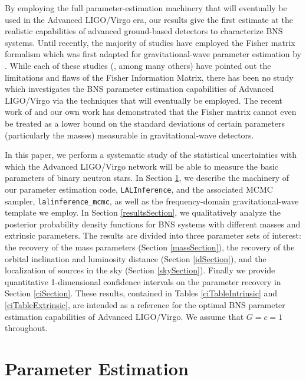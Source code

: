 \documentclass[11pt,a4paper]{emulateapj}
\begin{document}
By employing the full parameter-estimation machinery that will eventually be
used in the Advanced LIGO/Virgo era, our results give the first estimate at the 
realistic capabilities of advanced ground-based detectors to characterize BNS systems.
  Until recently, the majority of studies have employed the Fisher matrix formalism which was 
first adapted for gravitational-wave parameter estimation by \citep{FinnDetection}.
While each of these studies (\cite{PoissonWill,CutlerFlanagan,ArunPE}, among 
many others) have pointed out the limitations 
and flaws of the Fisher Information Matrix, there has been no study which investigates
the BNS parameter estimation capabilities of Advanced LIGO/Virgo via the techniques
that will eventually be employed.  The recent work of \cite{Vallisneri} and our 
own work \citep{Inadequacies} has demonstrated that the Fisher matrix cannot even
be treated as a lower bound on the standard deviations of certain parameters
(particularly the masses) measurable in gravitational-wave detectors.

In this paper, we perform a systematic study of the statistical uncertainties with
which the Advanced LIGO/Virgo network will be able to measure the basic parameters of 
binary neutron stars.  In Section \ref{PEsection}, we describe
the machinery of our parameter estimation code, \texttt{LALInference}, and the associated
MCMC sampler, \texttt{lalinference\_mcmc}, as well as the frequency-domain 
gravitational-wave template we employ.   In Section \ref{resultsSection}, we qualitatively 
analyze the posterior probability density functions for BNS systems with different masses 
and extrinsic parameters.  The results are divided into three parameter sets of interest: the
recovery of the mass parameters (Section \ref{massSection}), the recovery of the orbital
inclination and luminosity distance (Section \ref{idSection}), and the localization of sources 
in the sky (Section \ref{skySection}).   Finally we provide quantitative 1-dimensional confidence
 intervals on the parameter recovery in Section \ref{ciSection}.  These results, contained
 in Tables \ref{ciTableIntrinsic} and \ref{ciTableExtrinsic}, are intended as a reference for the 
 optimal BNS parameter estimation capabilities of Advanced LIGO/Virgo.
   We assume that $G=c=1$ throughout.


\section{Parameter Estimation}
\label{PEsection}
\end{document}
